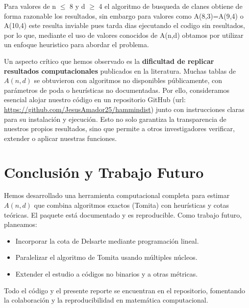 \documentclass[12pt, spanish]{article}
\begin{document}
Para valores de n $\leq$ 8 y d $\geq$ 4 el algoritmo de busqueda de clanes obtiene de forma razonable los resultados, sin embargo para valores como A(8,3)=A(9,4) o A(10,4) este resulta inviable pues tarda dias ejecutando el codigo sin resultados, por lo que, mediante el uso de valores conocidos de A(n,d) obtamos por utilizar un enfoque heuristico para abordar el problema. 

Un aspecto crítico que hemos observado es la \textbf{dificultad de replicar resultados computacionales} publicados en la literatura. Muchas tablas de $A(n,d)$ se obtuvieron con algoritmos no disponibles públicamente, con parámetros de poda o heurísticas no documentadas. Por ello, consideramos esencial alojar nuestro código en un repositorio GitHub (url: \url{https://github.com/JesusAmador25/hammindist}) junto con instrucciones claras para su instalación y ejecución. Esto no solo garantiza la transparencia de nuestros propios resultados, sino que permite a otros investigadores verificar, extender o aplicar nuestras funciones.

\section{Conclusión y Trabajo Futuro}
Hemos desarrollado una herramienta computacional completa para estimar $A(n,d)$ que combina algoritmos exactos (Tomita) con heurísticas y cotas teóricas. El paquete está documentado y es reproducible. Como trabajo futuro, planeamos:
\begin{itemize}
\item Incorporar la cota de Delsarte mediante programación lineal.
\item Paralelizar el algoritmo de Tomita usando múltiples núcleos.
\item Extender el estudio a códigos no binarios y a otras métricas.
\end{itemize}
Todo el código y el presente reporte se encuentran en el repositorio, fomentando la colaboración y la reproducibilidad en matemática computacional.
\end{document}
